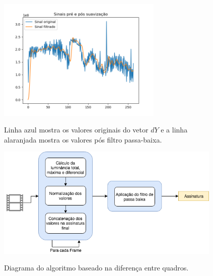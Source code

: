\begin{figure}[h]
\centering
	\caption{Linha azul mostra os valores originais do vetor $dY$ e a linha alaranjada mostra os valores pós filtro passa-baixa.}
  	\includegraphics[width=0.7\textwidth]{dados/figuras/filtro_passa_baixa}
  \label{fig:framediff-passa-baixa}
\end{figure}


 \begin{figure}[h]
      \centering
      \caption{Diagrama do algoritmo baseado na diferença entre quadros.}
      \includegraphics[width=0.96\textwidth]{dados/figuras/diagramas/Diag-FrameDiff}
       	\label{fig:dia_framediff}
    \end{figure}  


    
